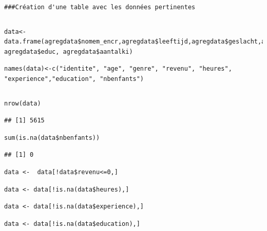 \documentclass[a4paper, french, 11 pt]{article}\usepackage[]{graphicx}\usepackage[]{xcolor}
\makeatletter
\newenvironment{kframe}{%
 \def\at@end@of@kframe{}%
 \ifinner\ifhmode%
  \def\at@end@of@kframe{\end{minipage}}%
  \begin{minipage}{\columnwidth}%
 \fi\fi%
 \def\FrameCommand##1{\hskip\@totalleftmargin \hskip-\fboxsep
 \colorbox{shadecolor}{##1}\hskip-\fboxsep
     \hskip-\linewidth \hskip-\@totalleftmargin \hskip\columnwidth}%
 \MakeFramed {\advance\hsize-\width
   \@totalleftmargin\z@ \linewidth\hsize
   \@setminipage}}%
 {\par\unskip\endMakeFramed%
 \at@end@of@kframe}
\newenvironment{knitrout}{}{} %
\makeatother
\begin{document}
\begin{knitrout}
\begin{kframe}
{\ttfamily\noindent\bfseries\color{errorcolor}{\#\# Error in grDevices::pdf(file = filename, ..., version = version): cannot open file 'figure/educ.pdf'}}\begin{lstlisting}[basicstyle=\ttfamily,breaklines=true]
###Création d'une table avec les données pertinentes\end{lstlisting}
\begin{lstlisting}[basicstyle=\ttfamily,breaklines=true]
\end{lstlisting}
\begin{lstlisting}[basicstyle=\ttfamily,breaklines=true]
data<-data.frame(agregdata$nomem_encr,agregdata$leeftijd,agregdata$geslacht,agregdata$brutoink,agregdata$cw22o127,agregdata$cw22o134, agregdata$educ, agregdata$aantalki)\end{lstlisting}
\begin{lstlisting}[basicstyle=\ttfamily,breaklines=true]
names(data)<-c("identite", "age", "genre", "revenu", "heures", "experience","education", "nbenfants")\end{lstlisting}
\begin{lstlisting}[basicstyle=\ttfamily,breaklines=true]
\end{lstlisting}
\begin{lstlisting}[basicstyle=\ttfamily,breaklines=true]
nrow(data)\end{lstlisting}
\begin{lstlisting}[basicstyle=\ttfamily,breaklines=true]
## [1] 5615
\end{lstlisting}
\begin{lstlisting}[basicstyle=\ttfamily,breaklines=true]
sum(is.na(data$nbenfants))\end{lstlisting}
\begin{lstlisting}[basicstyle=\ttfamily,breaklines=true]
## [1] 0
\end{lstlisting}
\begin{lstlisting}[basicstyle=\ttfamily,breaklines=true]
data <-  data[!data$revenu<=0,]\end{lstlisting}
\begin{lstlisting}[basicstyle=\ttfamily,breaklines=true]
data <- data[!is.na(data$heures),]\end{lstlisting}
\begin{lstlisting}[basicstyle=\ttfamily,breaklines=true]
data <- data[!is.na(data$experience),]\end{lstlisting}
\begin{lstlisting}[basicstyle=\ttfamily,breaklines=true]
data <- data[!is.na(data$education),]\end{lstlisting}

\end{kframe}
\end{knitrout}
\end{document}
